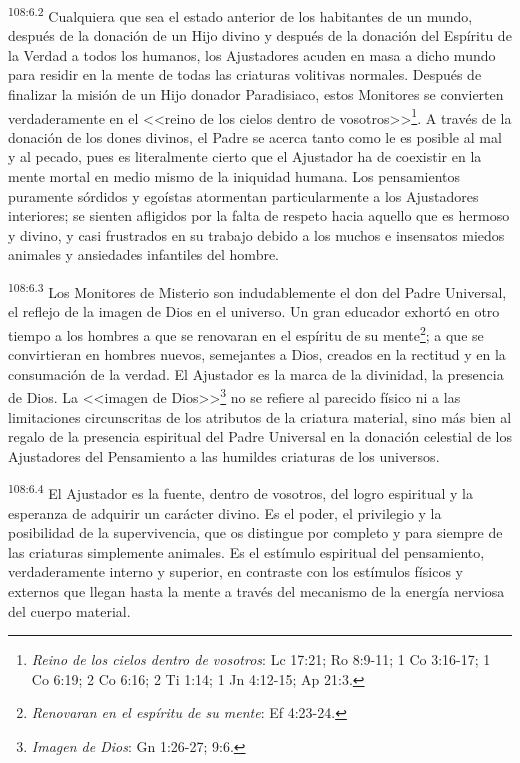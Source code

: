 \documentclass[twoside, 11pt]{book}
\begin{document}
\par
\textsuperscript{108:6.2} Cualquiera que sea el estado anterior de los habitantes de un mundo, después de la donación de un Hijo divino y después de la donación del Espíritu de la Verdad a todos los humanos, los Ajustadores acuden en masa a dicho mundo para residir en la mente de todas las criaturas volitivas normales. Después de finalizar la misión de un Hijo donador Paradisiaco, estos Monitores se convierten verdaderamente en el <<reino de los cielos dentro de vosotros>>\footnote{\textit{Reino de los cielos dentro de vosotros}: Lc 17:21; Ro 8:9-11; 1 Co 3:16-17; 1 Co 6:19; 2 Co 6:16; 2 Ti 1:14; 1 Jn 4:12-15; Ap 21:3.}. A través de la donación de los dones divinos, el Padre se acerca tanto como le es posible al mal y al pecado, pues es literalmente cierto que el Ajustador ha de coexistir en la mente mortal en medio mismo de la iniquidad humana. Los pensamientos puramente sórdidos y egoístas atormentan particularmente a los Ajustadores interiores; se sienten afligidos por la falta de respeto hacia aquello que es hermoso y divino, y casi frustrados en su trabajo debido a los muchos e insensatos miedos animales y ansiedades infantiles del hombre.

\par
\textsuperscript{108:6.3} Los Monitores de Misterio son indudablemente el don del Padre Universal, el reflejo de la imagen de Dios en el universo. Un gran educador exhortó en otro tiempo a los hombres a que se renovaran en el espíritu de su mente\footnote{\textit{Renovaran en el espíritu de su mente}: Ef 4:23-24.}; a que se convirtieran en hombres nuevos, semejantes a Dios, creados en la rectitud y en la consumación de la verdad. El Ajustador es la marca de la divinidad, la presencia de Dios. La <<imagen de Dios>>\footnote{\textit{Imagen de Dios}: Gn 1:26-27; 9:6.} no se refiere al parecido físico ni a las limitaciones circunscritas de los atributos de la criatura material, sino más bien al regalo de la presencia espiritual del Padre Universal en la donación celestial de los Ajustadores del Pensamiento a las humildes criaturas de los universos.

\par
\textsuperscript{108:6.4} El Ajustador es la fuente, dentro de vosotros, del logro espiritual y la esperanza de adquirir un carácter divino. Es el poder, el privilegio y la posibilidad de la supervivencia, que os distingue por completo y para siempre de las criaturas simplemente animales. Es el estímulo espiritual del pensamiento, verdaderamente interno y superior, en contraste con los estímulos físicos y externos que llegan hasta la mente a través del mecanismo de la energía nerviosa del cuerpo material.
\end{document}
